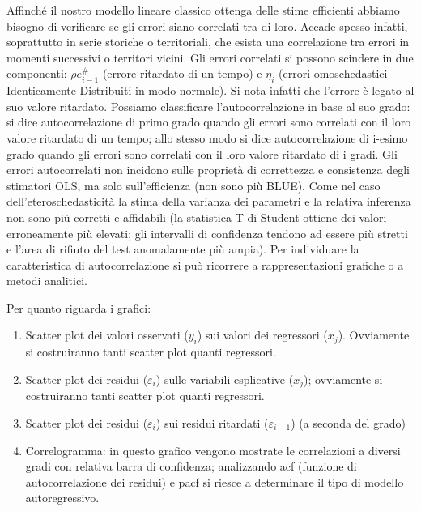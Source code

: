 \documentclass[a4page, 11pt]{article} %
\begin{document}
Affinché il nostro modello lineare classico ottenga delle stime efficienti abbiamo bisogno di verificare se gli errori siano correlati tra di loro.
Accade spesso infatti, soprattutto in serie storiche o territoriali, che esista una correlazione tra errori in momenti successivi o territori vicini.
Gli errori correlati si possono scindere in due componenti: $\rho e_{ i-1}^{\#}$ (errore ritardato di un tempo) e $\eta_i$ (errori omoschedastici Identicamente Distribuiti in modo normale).
Si nota infatti che l’errore è legato al suo valore ritardato.
Possiamo classificare l’autocorrelazione in base al suo grado: si dice autocorrelazione di primo grado quando gli errori sono correlati con il loro valore ritardato di un tempo; allo stesso modo si dice autocorrelazione di i-esimo grado quando gli errori sono correlati con il loro valore ritardato di i gradi. Gli errori autocorrelati non incidono sulle proprietà di correttezza e consistenza degli stimatori OLS, ma solo sull’efficienza (non sono più BLUE). Come nel caso dell’eteroschedasticità la stima della varianza dei parametri e la relativa inferenza non sono più corretti e affidabili (la statistica T di Student ottiene dei valori erroneamente più elevati; gli intervalli di confidenza tendono ad essere più stretti e l'area di rifiuto del test anomalamente più ampia).
Per individuare la caratteristica di autocorrelazione si può ricorrere a rappresentazioni grafiche o a metodi analitici.

Per quanto riguarda i grafici:
\begin{enumerate}[noitemsep]
\item Scatter plot dei valori osservati ($y_i$) sui valori dei regressori ($x_j$). Ovviamente si costruiranno tanti scatter plot quanti regressori.
\item Scatter plot dei residui ($\varepsilon_i$) sulle variabili esplicative ($x_j$); ovviamente si costruiranno tanti scatter plot quanti regressori.
\item Scatter plot dei residui ($\varepsilon_i$) sui residui ritardati ($\varepsilon_{i-1}$) (a seconda del grado)
\item Correlogramma: in questo grafico vengono mostrate le correlazioni a diversi gradi con relativa barra di confidenza; analizzando acf (funzione di autocorrelazione dei residui) e pacf si riesce a determinare il tipo di modello autoregressivo.
\end{enumerate}
\end{document}

